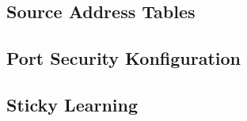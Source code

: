 \subsection{Source Address Tables}

\clearpage
\pagebreak
\subsection{Port Security Konfiguration}

\clearpage
\pagebreak
\subsection{Sticky Learning}
